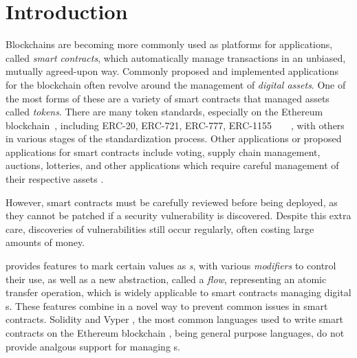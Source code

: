 \documentclass[dvipsnames, usenames, sigconf]{acmart}
\begin{document}

\maketitle


\section{Introduction}

Blockchains are becoming more commonly used as platforms for applications, called \emph{smart contracts}, which automatically manage transactions in an unbiased, mutually agreed-upon way.
Commonly proposed and implemented applications for the blockchain often revolve around the management of \emph{digital assets}. 
One of the most forms of these are a variety of smart contracts that managed assets called \emph{tokens}.
There are many token standards, especially on the Ethereum blockchain~\cite{wood2014ethereum}, including ERC-20, ERC-721, ERC-777, ERC-1155~\cite{erc20}~\cite{erc721}~\cite{erc777}~\cite{erc1155}, with others in various stages of the standardization process.
Other applications or proposed applications for smart contracts include voting, supply chain management, auctions, lotteries, and other applications which require careful management of their respective assets .

However, smart contracts must be carefully reviewed before being deployed, as they cannot be patched if a security vulnerability is discovered.
Despite this extra care, discoveries of vulnerabilities still occur regularly, often costing large amounts of money.

\langName provides features to mark certain values as \emph{\assetTxt{}s}, with various \emph{modifiers} to control their use, as well as a new abstraction, called a \emph{flow}, representing an atomic transfer operation, which is widely applicable to smart contracts managing digital \assetTxt{}s.
These features combine in a novel way to prevent common issues in smart contracts.
Solidity  and Vyper , the most common languages used to write smart contracts on the Ethereum blockchain , being general purpose languages, do not provide analgous support for managing \assetTxt{}s.
\end{document}
